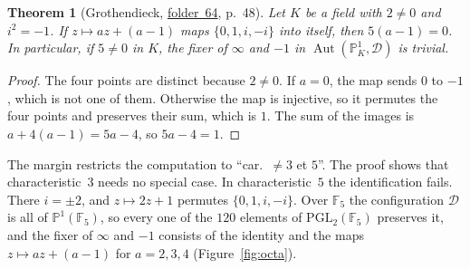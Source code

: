 \documentclass[11pt,a4paper]{amsart}
\newtheorem{theorem}{Theorem}[section]
\theoremstyle{definition}
\theoremstyle{remark}
\newcommand{\F}{\mathbb F}
\newcommand{\PP}{\mathbb P^1}
\newcommand{\PGL}{\mathrm{PGL}_2}
\newcommand{\fac}[1]{\href{https://grothendieck.umontpellier.fr/#1.pdf}{folder~#1}}
\begin{document}
\begin{theorem}[Grothendieck, \fac{64}, p.~48]\label{thm:fixer}
Let $K$ be a field with $2 \ne 0$ and $i^2 = -1$. If $z \mapsto az + (a - 1)$ maps $\{0, 1, i, -i\}$ into itself, then $5(a - 1) = 0$. In particular, if $5 \ne 0$ in $K$, the fixer of $\infty$ and $-1$ in $\operatorname{Aut}(\PP_K, \mathcal{D})$ is trivial.
\end{theorem}

\begin{proof}
The four points are distinct because $2 \ne 0$. If $a = 0$, the map sends $0$ to $-1$, which is not one of them. Otherwise the map is injective, so it permutes the four points and preserves their sum, which is $1$. The sum of the images is $a + 4(a - 1) = 5a - 4$, so $5a - 4 = 1$.
\end{proof}

The margin restricts the computation to ``car.~$\ne 3$ et $5$''. The proof shows that characteristic~$3$ needs no special case. In characteristic~$5$ the identification fails. There $i = \pm 2$, and $z \mapsto 2z + 1$ permutes $\{0, 1, i, -i\}$. Over $\F_5$ the configuration $\mathcal{D}$ is all of $\PP(\F_5)$, so every one of the $120$ elements of $\PGL(\F_5)$ preserves it, and the fixer of $\infty$ and $-1$ consists of the identity and the maps $z \mapsto az + (a - 1)$ for $a = 2, 3, 4$ (Figure~\ref{fig:octa}).
\end{document}
